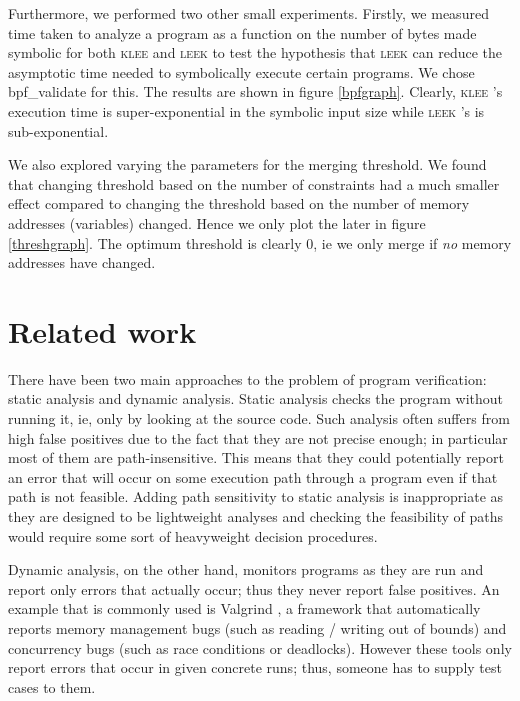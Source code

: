 \documentclass[12pt,a4paper]{article}
\newcommand{\klee}{\textsc{klee }}
\newcommand{\leek}{\textsc{leek }}
\begin{document}
Furthermore, we performed two other small experiments. Firstly, we measured time taken to analyze a program as a function on the number of bytes made symbolic for both \klee and \leek to test the hypothesis that \leek can reduce the asymptotic time needed to symbolically execute certain programs. We chose bpf\_validate for this. The results are shown in figure \ref{bpfgraph}. Clearly, \klee's execution time is super-exponential in the symbolic input size while \leek's is sub-exponential.

We also explored varying the parameters for the merging threshold. We found that changing threshold based on the number of constraints had a much smaller effect compared to changing the threshold based on the number of memory addresses (variables) changed. Hence we only plot the later in figure \ref{threshgraph}. The optimum threshold is clearly 0, ie we only merge if \emph{no} memory addresses have changed.

\section{Related work}\label{related}
There have been two main approaches to the problem of program verification: static analysis \cite{MC} and dynamic analysis. Static analysis checks the program without running it, ie, only by looking at the source code. Such analysis often suffers from high false positives due to the fact that they are not precise enough; in particular most of them are path-insensitive. This means that they could potentially report an error that will occur on some execution path through a program even if that path is not feasible. Adding path sensitivity to static analysis is inappropriate as they are designed to be lightweight analyses and checking the feasibility of paths would require some sort of heavyweight decision procedures.

Dynamic analysis, on the other hand, monitors programs as they are run and report only errors that actually occur; thus they never report false positives. An example that is commonly used is Valgrind \cite{valgrind}, a framework that automatically reports memory management bugs (such as reading / writing out of bounds) and concurrency bugs (such as race conditions or deadlocks). However these tools only report errors that occur in given concrete runs; thus, someone has to supply test cases to them.
\end{document}
